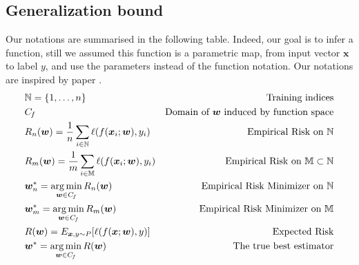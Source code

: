 \documentclass[11pt, a4paper, reqno, twoside]{scrartcl}
\theoremstyle{style}
\DeclareMathOperator*{\argmin}{\arg\min}
\newcommand{\Cf}{C_{\hspace{-0.08em}f}}
\newcommand{\wv}{\bm{w}}
\newcommand{\xv}{\bm{x}}
\newcommand{\N}{\mathbb{N}}
\newcommand{\M}{\mathbb{M}}
\newcommand{\0}{\mathbf{0}} %
\begin{document}
 \subsection{Generalization bound}
 Our notations are summarised in the following table. Indeed, our goal is
 to infer a function, still we assumed this function is a parametric map, from
 input vector $\xv$ to label $y$, and use the parameters instead of the function
 notation. Our notations are
 inspired by paper \cite{bousquet2004introduction}.
\begin{eqnarray}
    & \N = \{1,\ldots,n\} & \text{Training indices} \nonumber\\ 
    &  \Cf & \text{Domain of $\wv$ induced by function
    space} \nonumber\\
     & R_n(\wv) = \frac{1}{n} \sum_{i\in \N} \ell(f(\xv_i;\wv),y_i)&
    \text{ Empirical Risk on $\N$} \nonumber\\
    & R_{m}(\wv) = \frac{1}{m} \sum_{i \in \M} \ell(f(\xv_i;\wv),y_i)&
    \text{Empirical Risk on $\M\subset \N$}\nonumber\\ 
    & \wv_n^* = \argmin_{\wv \in \Cf} R_n(\wv) &\text{Empirical Risk Minimizer
    on $\N$}\nonumber\\
    & \wv_m^* = \argmin_{\wv \in \Cf} R_m(\wv) &\text{Empirical Risk Minimizer
    on $\M$}\nonumber\\ 
    & R(\wv) = E_{\xv,y\sim P}[\ell(f(\xv;\wv),y)]&\text{ Expected Risk}
    \nonumber\\
    & \wv^* = \argmin_{\wv\in \Cf} R(\wv) &\text{The true best estimator}
    \nonumber
\end{eqnarray}
\end{document}
